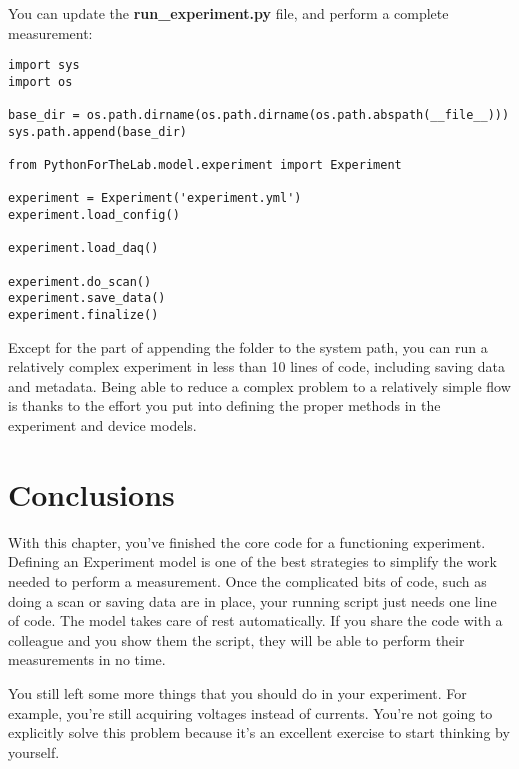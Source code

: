 You can update the \textbf{run\_experiment.py} file, and perform a complete measurement:

\begin{verbatim}
import sys
import os

base_dir = os.path.dirname(os.path.dirname(os.path.abspath(__file__)))
sys.path.append(base_dir)

from PythonForTheLab.model.experiment import Experiment

experiment = Experiment('experiment.yml')
experiment.load_config()

experiment.load_daq()

experiment.do_scan()
experiment.save_data()
experiment.finalize()
\end{verbatim}

Except for the part of appending the folder to the system path, you can run a relatively complex experiment in less than 10 lines of code, including saving data and metadata. Being able to reduce a complex problem to a relatively simple flow is thanks to the effort you put into defining the proper methods in the experiment and device models.

\section{Conclusions}\label{sec:experiment-model-conclusions}
With this chapter, you've finished the core code for a functioning experiment. Defining an Experiment model is one of the best strategies to simplify the work needed to perform a measurement. Once the complicated bits of code, such as doing a scan or saving data are in place, your running script just needs one line of code. The model takes care of rest automatically. If you share the code with a colleague and you show them the  script, they will be able to perform their measurements in no time.

You still left some more things that you should do in your experiment. For example, you're still acquiring voltages instead of currents. You're not going to explicitly solve this problem because it's an excellent exercise to start thinking by yourself.


